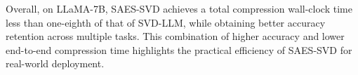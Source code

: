 Overall, on LLaMA-7B, SAES-SVD achieves a total compression wall-clock time less than one-eighth of that of SVD-LLM, while obtaining better accuracy retention across multiple tasks. This combination of higher accuracy and lower end-to-end compression time highlights the practical efficiency of SAES-SVD for real-world deployment.


\color{black}
